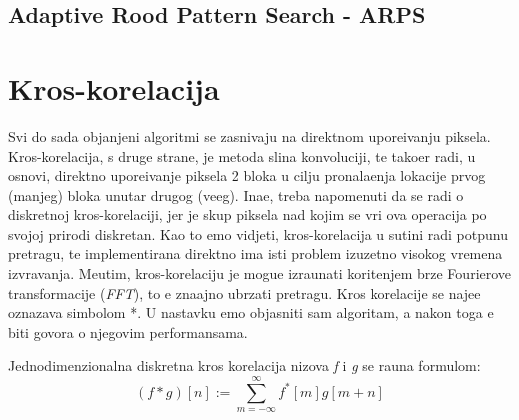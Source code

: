 \subsection{Adaptive Rood Pattern Search - ARPS}

\section{Kros-korelacija} %
Svi do sada obja\sh njeni algoritmi se zasnivaju na direktnom upore\dj ivanju piksela. Kros-korelacija, s druge strane, je metoda sli\ch na konvoluciji, te tako\dj er radi, u osnovi, direktno upore\dj ivanje piksela 2 bloka u
cilju pronala\zh enja lokacije prvog (manjeg) bloka unutar drugog (ve\cj eg). Ina\ch e, treba napomenuti da se radi o diskretnoj kros-korelaciji, jer je skup piksela nad kojim se vr\sh i ova operacija po svojoj prirodi
diskretan. Kao \sh to \cj emo vidjeti, kros-korelacija u su\sh tini radi potpunu pretragu, te implementirana direktno ima isti problem izuzetno visokog vremena izvr\sh avanja. Me\dj utim, kros-korelaciju je mogu\cj e
izra\ch unati kori\sh tenjem brze Fourierove transformacije (\textit{FFT}), \sh to \cj e zna\ch ajno ubrzati pretragu. Kros korelacije se naj\ch e\sh \cj e ozna\ch zava simbolom *. U nastavku \cj emo objasniti sam algoritam, 
a nakon toga \cj e biti govora o njegovim performansama.

Jednodimenzionalna diskretna kros korelacija nizova \textit{f} i \textit{g} se ra\ch una formulom: 
$$
(f * g) [n] := \sum_{m=-\infty}^{\infty}f^{*}[m]g[m+n]
$$